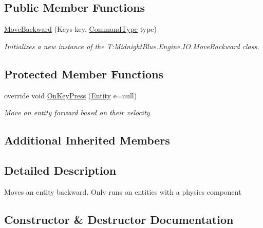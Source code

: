 \subsection*{Public Member Functions}
\begin{DoxyCompactItemize}
\item 
\hyperlink{class_midnight_blue_1_1_engine_1_1_i_o_1_1_move_backward_a924ef15b3e0f3f25286e7ed48fe48fbe}{Move\+Backward} (Keys key, \hyperlink{namespace_midnight_blue_1_1_engine_1_1_i_o_a8bc3f159399ecadd590f7df1b54354b0}{Command\+Type} type)
\begin{DoxyCompactList}\small\item\em Initializes a new instance of the T\+:\+Midnight\+Blue.\+Engine.\+I\+O.\+Move\+Backward class. \end{DoxyCompactList}\end{DoxyCompactItemize}
\subsection*{Protected Member Functions}
\begin{DoxyCompactItemize}
\item 
override void \hyperlink{class_midnight_blue_1_1_engine_1_1_i_o_1_1_move_backward_ab6756c1bb48258e4d50038f492d70bae}{On\+Key\+Press} (\hyperlink{class_midnight_blue_1_1_engine_1_1_entity_component_1_1_entity}{Entity} e=null)
\begin{DoxyCompactList}\small\item\em Move an entity forward based on their velocity \end{DoxyCompactList}\end{DoxyCompactItemize}
\subsection*{Additional Inherited Members}


\subsection{Detailed Description}
Moves an entity backward. Only runs on entities with a physics component 



\subsection{Constructor \& Destructor Documentation}
\hypertarget{class_midnight_blue_1_1_engine_1_1_i_o_1_1_move_backward_a924ef15b3e0f3f25286e7ed48fe48fbe}{}\label{class_midnight_blue_1_1_engine_1_1_i_o_1_1_move_backward_a924ef15b3e0f3f25286e7ed48fe48fbe} 
